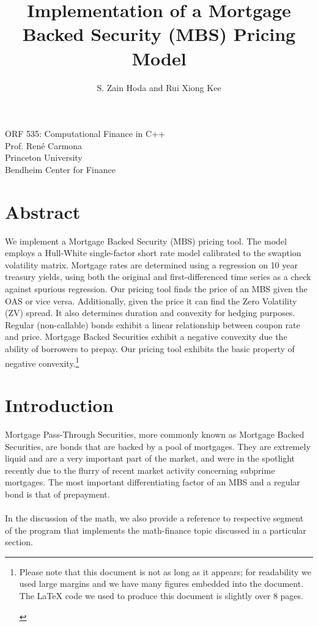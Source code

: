 \documentclass[10pt,letterpaper]{article}
\author{S. Zain Hoda and Rui Xiong Kee}
\title{Implementation of a Mortgage Backed Security (MBS) Pricing Model}
\begin{document}
\maketitle
\begin{center}
ORF 535: Computational Finance in C++\\
Prof. Ren\'e Carmona\\
Princeton University\\
Bendheim Center for Finance
\end{center}
\section*{Abstract}
We implement a Mortgage Backed Security (MBS) pricing tool. The model employs a Hull-White single-factor short rate model calibrated to the swaption volatility matrix. Mortgage rates are determined using a regression on 10 year treasury yields, using both the original and first-differenced time series as a check against spurious regression. Our pricing tool finds the price of an MBS given the OAS or vice versa. Additionally, given the price it can find the Zero Volatility (ZV) spread. It also determines duration and convexity for hedging purposes. Regular (non-callable) bonds exhibit a linear relationship between coupon rate and price. Mortgage Backed Securities exhibit a negative convexity due the ability of borrowers to prepay. Our pricing tool exhibits the basic property of negative convexity.\footnote{\begin{normalsize}Please note that this document is not as long as it appears; for readability we used large margins and we have many figures embedded into the document. The \LaTeX{} code we used to produce this document is slightly over 8 pages.\end{normalsize}}
\newpage
\section{Introduction}
Mortgage Pass-Through Securities, more commonly known as Mortgage Backed Securities, are bonds that are backed by a pool of mortgages. They are extremely liquid and are a very important part of the market, and were in the spotlight recently due to the flurry of recent market activity concerning subprime mortgages. The most important differentiating factor of an MBS and a regular bond is that of prepayment.\\
\\
In the discussion of the math, we also provide a reference to respective segment of the program that implements the math-finance topic discussed in a particular section.
\end{document}
